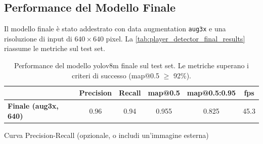 \documentclass[12pt,a4paper,openright,twoside]{book}
\begin{document}
\subsection{Performance del Modello Finale}
Il modello finale è stato addestrato con data augmentation \texttt{aug3x} e una risoluzione di input di $640\times640$ pixel. 
La \autoref{tab:player_detector_final_results} riassume le metriche sul test set.

\begin{table}[t]
  \centering
  \caption{Performance del modello \ac{yolo}v8m finale sul test set. 
  Le metriche superano i criteri di successo (\ac{map}@0.5 $\geq$ 92\%).}
  \label{tab:player_detector_final_results}
  \begin{tabular}{l S[table-format=1.3] S[table-format=1.3] S[table-format=1.3] S[table-format=1.3] S[table-format=2.1]}
    \toprule
    & {\textbf{Precision}} & {\textbf{Recall}} & {\textbf{\ac{map}@0.5}} & {\textbf{\ac{map}@0.5:0.95}} & {\textbf{\ac{fps}}} \\
    \midrule
    \textbf{Finale (aug3x, 640)} 
      & 0.96 & 0.94 & 0.955 & 0.825 & 45.3 \\
    \bottomrule
  \end{tabular}
\end{table}

\begin{table}[h]
  \centering
  \caption{Performance del modello \ac{yolo}v8m finale sul test set. Le metriche superano i criteri di successo definiti 
  (\ac{map}@0.5 $\geq$ 92\%), confermando l'elevata accuratezza del detector.}
  \label{tab:player_detector_final_results}
\end{table}

Curva Precision-Recall (opzionale, o includi un'immagine esterna)
\end{document}
